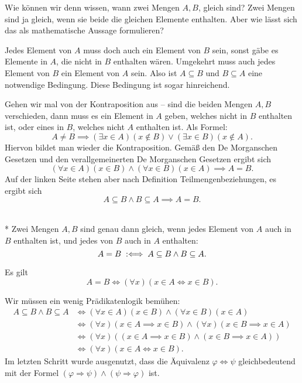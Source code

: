 Wie können wir denn wissen, wann zwei Mengen $A,B$, gleich sind?
Zwei Mengen sind ja gleich, wenn sie beide die gleichen Elemente
enthalten. Aber wie lässt sich das als mathematische Aussage
formulieren?

Jedes Element von $A$ muss doch auch ein Element von $B$ sein,
sonst gäbe es Elemente in $A$, die nicht in $B$ enthalten wären.
Umgekehrt muss auch jedes Element von $B$ ein Element von $A$ sein.
Also ist $A\subseteq B$ und $B\subseteq A$ eine notwendige Bedingung.
Diese Bedingung ist sogar hinreichend.

Gehen wir mal von der Kontraposition aus -- sind die beiden Mengen
$A,B$ verschieden, dann muss es ein Element in $A$ geben, welches nicht
in $B$ enthalten ist, oder eines in $B$, welches nicht $A$ enthalten
ist. Als Formel:%
\[A\ne B \implies (\exists x\in A)(x\notin B)\lor(\exists x\in B)(x\notin A).\]
Hiervon bildet man wieder die Kontraposition. Gemäß den
De Morganschen Gesetzen und den verallgemeinerten
De Morganschen Gesetzen ergibt sich%
\[(\forall x\in A)(x\in B)\land(\forall x\in B)(x\in A)\implies A=B.\]
Auf der linken Seite stehen aber nach Definition
Teilmengenbeziehungen, es ergibt sich%
\[A\subseteq B\land B\subseteq A\implies A=B.\]
\begin{Definition}%
\mbox{}\\*
Zwei Mengen $A,B$ sind genau dann gleich, wenn jedes Element von
$A$ auch in $B$ enthalten ist, und jedes von $B$ auch in $A$ enthalten:%
\[A=B\;:\Longleftrightarrow\; A\subseteq B\land B\subseteq A.\]
\end{Definition}
\begin{Satz}\label{set-eq}
Es gilt
\[A=B\iff (\forall x)(x\in A\iff x\in B).\]
\end{Satz}
 Wir müssen ein wenig Prädikatenlogik bemühen:%
\begin{align*}
A\subseteq B\land B\subseteq A
&\iff (\forall x\in A)(x\in B)\land(\forall x\in B)(x\in A)\\
&\iff (\forall x)(x\in A\implies x\in B)\land(\forall x)(x\in B\implies x\in A)\\
&\iff (\forall x)((x\in A\implies x\in B)\land (x\in B\implies x\in A))\\
&\iff (\forall x)(x\in A\iff x\in B).
\end{align*}
Im letzten Schritt wurde ausgenutzt, dass die Äquivalenz
$\varphi\Leftrightarrow\psi$ gleichbedeutend
mit der Formel $(\varphi\Rightarrow\psi)\land(\psi\Rightarrow\varphi)$
ist.\;\qedsymbol

